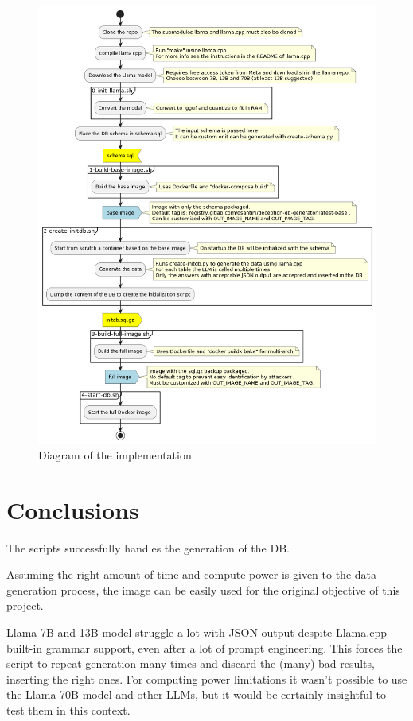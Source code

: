 \documentclass[12pt, letterpaper, twoside]{article}
\begin{document}
\begin{figure}
    \centering
    \includegraphics[width=0.9\linewidth]{diagram.png}
    \caption{Diagram of the implementation}
    \label{fig:diagram}
\end{figure}

\section{Conclusions}
\label{sec:conc}

The scripts successfully handles the generation of the DB.

Assuming the right amount of time and compute power is given to the data generation process, the image can be easily used for the original objective of this project.

Llama 7B and 13B model struggle a lot with JSON output despite Llama.cpp built-in grammar support, even after a lot of prompt engineering. This forces the script to repeat generation many times and discard the (many) bad results, inserting the right ones.
For computing power limitations it wasn't possible to use the Llama 70B model and other LLMs, but it would be certainly insightful to test them in this context.
\end{document}
